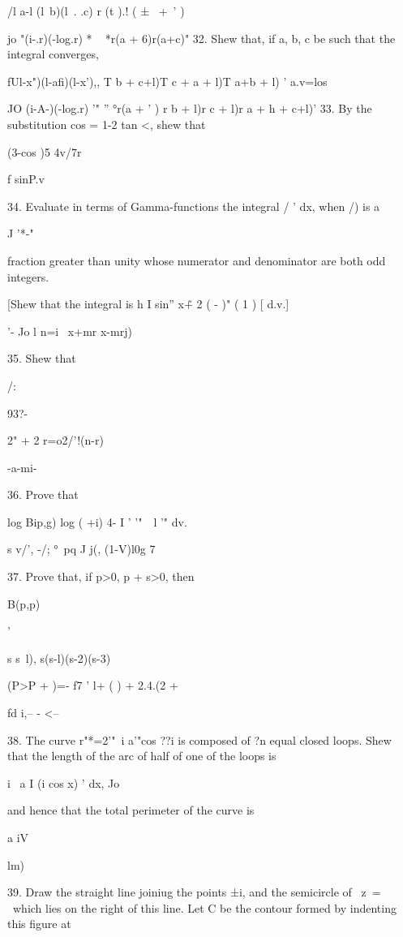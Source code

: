 /l a-l (l\ b)(l\ . .c) r (t ).! ( ± \ +\ ' )

jo "(i-.r)(-log.r) * ~ *r(a + 6)r(a+c)" 32. Shew that, if a, b, c be
such that the integral converges,

fUl-x")(l-afi)(l-x'),, T b + c+l)T c + a + l)T a+b + l) ' a.v=los

JO (i-A-)(-log.r) '" '' °r(a + ' ) r b + l)r c + l)r a + h + c+l)' 33.
By the substitution cos = 1-2 tan <, shew that

(3-cos )5 4v/7r


f sinP.v

34. Evaluate in terms of Gamma-functions the integral / ' dx, when /)
is a

J '*-"

fraction greater than unity whose numerator and denominator are both
odd integers.

[Shew that the integral is h I sin'' x\~+ 2 ( - )" ( 1 ) [ d.v.]

'- Jo l n=i \ x+mr x-mrj)

35. Shew that


/:

93?-

2" + 2 r=o2/'!(n-r)

-a-mi-

36. Prove that

log Bip,g) log ( +i) 4- I ' \: '"\ \ l '" dv. 

s v/', -/; °\ pq J j(, (1-V)l0g 7

37. Prove that, if p>0, p + s>0, then

B(p,p)

 '

s s~l), s(s-l)(s-2)(s-3)

 (P>P + )=- f7 ' l+ ( ) + 2.4.(2 +

fd i,-- - <--

38. The curve r"*=2'"~i a'"cos ??i is composed of ?n equal closed
loops. Shew that the length of the arc of half of one of the loops is

i~ a I (i cos x) ' dx, Jo

and hence that the total perimeter of the curve is

a iV

lm)\

%
%

39. Draw the straight line joiniug the points ±i, and the semicircle
of \ z\ = \ which lies on the right of this line. Let C be the contour
formed by indenting this figure at

